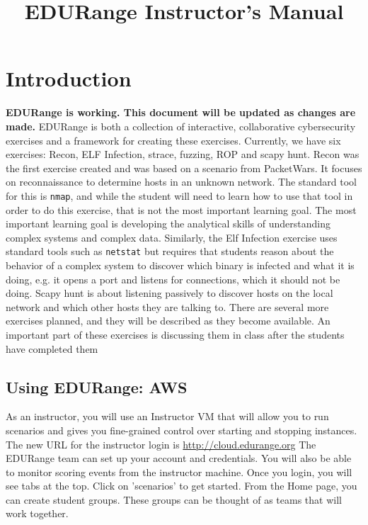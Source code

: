 \documentclass[11pt]{report}
\begin{document}
\title{EDURange Instructor's Manual}
\maketitle

%  
\section{Introduction}
\label{sec:intro}
{\bf  EDURange is working.  This document will be updated as changes are made.}
EDURange is both a collection of interactive, collaborative cybersecurity exercises and a framework 
for creating these exercises.  Currently, we have six exercises:  Recon, ELF Infection, strace, fuzzing, ROP and scapy hunt.
Recon was the first exercise created and was based on a scenario from PacketWars.  It
focuses on reconnaissance to determine hosts in an unknown network.  The standard tool for this is 
{\tt nmap}, and while the student will need to learn how to use that tool in order to do this exercise, 
that is
not the most important learning goal. The most important learning goal is developing the
analytical skills of understanding complex systems and complex data.  Similarly, the Elf Infection 
exercise uses standard tools such as {\tt netstat} but requires that students
reason about the behavior of a complex system to discover which binary is infected and 
what it is doing, e.g.
it opens a port and listens for connections, which it should not be doing.  
Scapy hunt is about listening passively to discover hosts on the local network and 
which other hosts they are talking to.
There are several more exercises planned, and they will be described as they become available.
An important part of these exercises is discussing them in class after the students have 
completed them



\subsection{Using EDURange: AWS}
As an instructor, you will use an Instructor VM that will allow you to run scenarios
and gives you fine-grained control over starting and stopping instances.
The new URL for the instructor login is \url{http://cloud.edurange.org}
The EDURange team can set up your account and credentials.
You will also be able to monitor scoring events from the instructor machine.
Once you login, you will see tabs at the top.  Click on 'scenarios' to get started.
From the Home page,  you can create student groups.  These groups can be thought of as teams that will work
together. %
\end{document}
